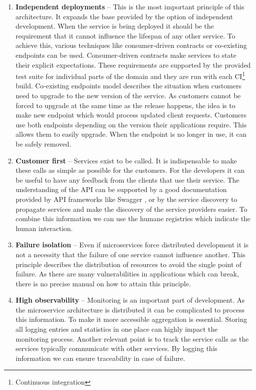 \documentclass[oneside,
  digital, %
  table,   %
  nolof,     %
  nolot,     %
]{fithesis3}
\begin{document}
\begin{enumerate}
	\item \textbf{Independent deployments} -- This is the most important principle of this architecture. It expands the base provided by the option of independent development. When the service is being deployed it should be the requirement that it cannot influence the lifespan of any other service. To achieve this, various techniques like consumer-driven contracts or co-existing endpoints can be used. Consumer-driven contracts make services to state their explicit expectations. These requirements are supported by the provided test suite for individual parts of the domain and they are run with each CI\footnote{Continuous integration} build. Co-existing endpoints model describes the situation when customers need to upgrade to the new version of the service. As customers cannot be forced to upgrade at the same time as the release happens, the idea is to make new endpoint which would process updated client requests. Customers use both endpoints depending on the version their applications require. This allows them to easily upgrade. When the endpoint is no longer in use, it can be safely removed.
	
	\item \textbf{Customer first} -- Services exist to be called. It is indispensable to make these calls as simple as possible for the customers. For the developers it can be useful to have any feedback from the clients that use their service. The understanding of the API can be supported by a good documentation provided by API frameworks like Swagger \cite{swagger}, or by the service discovery to propagate services and make the discovery of the service providers easier. To combine this information we can use the humane registries \cite{humane_registry} which indicate the human interaction. 
	
	\item \textbf{Failure isolation} -- Even if microservices force distributed development it is not a necessity that the failure of one service cannot influence another. This principle describes the distribution of resources to avoid the single point of failure. As there are many vulnerabilities in applications which can break, there is no precise manual on how to attain this principle.
	
	\item \textbf{High observability} -- Monitoring is an important part of development. As the microservice architecture is distributed it can be complicated to process this information. To make it more accessible aggregation is essential. Storing all logging entries and statistics in one place can highly impact the monitoring process. Another relevant point is to track the service calls as the services typically communicate with other services. By logging this information we can ensure traceability in case of failure.
	
\end{enumerate}
\end{document}
